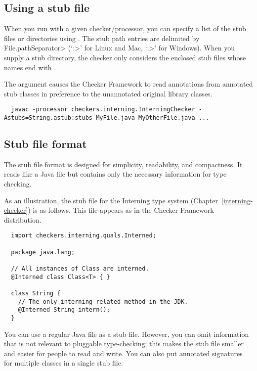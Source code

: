 \subsection{Using a stub file\label{stub-using}}

  When you run  with a given checker/processor, you can specify
  a list of the stub files or directories using
  .  The stub path entries
  are delimited by
  \<File.pathSeparator> (`\<:>' for Linux and Mac, `\<;>' for Windows).
  When you supply a stub directory, the checker only considers the enclosed
  stub files whose names end with .

  The  argument causes the Checker Framework to read annotations
  from annotated stub classes in preference to the unannotated original
  library classes.

\begin{smaller}
\begin{Verbatim}
  javac -processor checkers.interning.InterningChecker -Astubs=String.astub:stubs MyFile.java MyOtherFile.java ...
\end{Verbatim}
\end{smaller}


\subsection{Stub file format\label{stub-format}}

The stub file format is designed for simplicity, readability, and
compactness.  It reads like a Java file but contains only the
necessary information for type checking.

As an illustration, the stub file for the Interning type system
(Chapter~\ref{interning-checker}) is as follows.  This file appears as
 in the Checker Framework
distribution.

\begin{Verbatim}
  import checkers.interning.quals.Interned;

  package java.lang;

  // All instances of Class are interned.
  @Interned class Class<T> { }

  class String {
    // The only interning-related method in the JDK.
    @Interned String intern();
  }
\end{Verbatim}


You can use a regular Java file as a stub file.  However, you can omit
information that is not relevant to pluggable type-checking; this makes the
stub file smaller and easier for people to read and write.  You can also
put annotated signatures for multiple classes in a single stub file.


